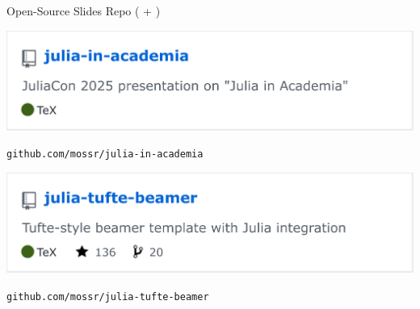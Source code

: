 \begin{frame}[fragile]{Open-Source Slides Repo ( + )}

\centering

\includegraphics[width=0.5\linewidth]{media/julia-in-academia.png}

\textcolor{repo}{\small \texttt{github.com/mossr/julia-in-academia}}

\pause

\phantom{---}

\phantom{---}

\includegraphics[width=0.5\linewidth]{media/julia-tufte-beamer.png}

\textcolor{repo}{\small \texttt{github.com/mossr/julia-tufte-beamer}}

\end{frame}